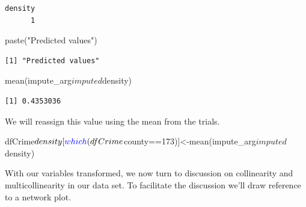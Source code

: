 \documentclass[]{article}
\newenvironment{Shaded}{}{}
\newcommand{\DecValTok}[1]{#1}
\newcommand{\KeywordTok}[1]{\textcolor[rgb]{0.00,0.00,1.00}{#1}}
\newcommand{\NormalTok}[1]{#1}
\newcommand{\OperatorTok}[1]{#1}
\newcommand{\StringTok}[1]{\textcolor[rgb]{0.00,0.50,0.50}{#1}}
\begin{document}
\begin{verbatim}
density 
      1 
\end{verbatim}

\begin{Shaded}
\begin{Highlighting}[]
\KeywordTok{paste}\NormalTok{(}\StringTok{"Predicted values"}\NormalTok{)}
\end{Highlighting}
\end{Shaded}

\begin{verbatim}
[1] "Predicted values"
\end{verbatim}

\begin{Shaded}
\begin{Highlighting}[]
\KeywordTok{mean}\NormalTok{(impute_arg}\OperatorTok{$}\NormalTok{imputed}\OperatorTok{$}\NormalTok{density)}
\end{Highlighting}
\end{Shaded}

\begin{verbatim}
[1] 0.4353036
\end{verbatim}

We will reassign this value using the mean from the trials.

\begin{Shaded}
\begin{Highlighting}[]
\NormalTok{dfCrime}\OperatorTok{$}\NormalTok{density[}\KeywordTok{which}\NormalTok{(dfCrime}\OperatorTok{$}\NormalTok{county}\OperatorTok{==}\DecValTok{173}\NormalTok{)]<-}\KeywordTok{mean}\NormalTok{(impute_arg}\OperatorTok{$}\NormalTok{imputed}\OperatorTok{$}\NormalTok{density)}
\end{Highlighting}
\end{Shaded}

With our variables transformed, we now turn to discussion on
collinearity and multicollinearity in our data set. To facilitate the
discussion we'll draw reference to a network plot.
\end{document}
